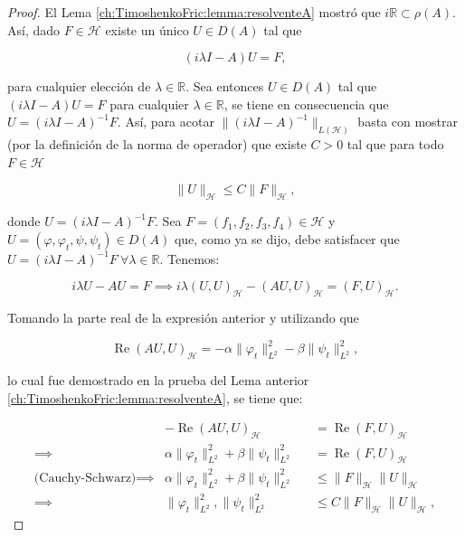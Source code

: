 \begin{proof}
    El Lema \ref{ch:TimoshenkoFric:lemma:resolventeA} mostró que $i\mathbb{R} \subset \rho(A)$. Así, dado $F \in \mathcal{H}$ existe un único $U \in D(A)$ tal que

    \[(i\lambda I - A)U = F,\]

    para cualquier elección de $\lambda \in \mathbb{R}$. Sea entonces $U \in D(A)$ tal que $(i\lambda I - A)U = F$ para cualquier $\lambda \in \mathbb{R}$, se tiene en consecuencia que $U = (i\lambda I - A)^{-1}F$. Así, para acotar $\lVert (i\lambda I - A)^{-1}\rVert_{L(\mathcal{H})}$ basta con mostrar (por la definición de la norma de operador) que existe $C > 0$ tal que para todo $F \in \mathcal{H}$

    \[\lVert U \rVert_{\mathcal{H}} \leq C \lVert F \rVert_{\mathcal{H}},\]

    donde $U = (i\lambda I - A)^{-1}F$. Sea $F = (f_1, f_2, f_3, f_4) \in \mathcal{H}$ y $U = (\varphi, \varphi_t, \psi, \psi_t) \in D(A)$ que, como ya se dijo, debe satisfacer que $U = (i\lambda I - A)^{-1}F \ \forall \lambda \in \mathbb{R}$. Tenemos:

    \[i\lambda U - AU = F \implies i\lambda (U,U)_{\mathcal{H}} - (AU, U)_{\mathcal{H}} = (F,U)_{\mathcal{H}}.\]

    Tomando la parte real de la expresión anterior y utilizando que

    \[\operatorname{Re}(AU, U)_{\mathcal{H}} = -\alpha \lVert \varphi_t\rVert^2_{L^2} - \beta\lVert \psi_t \rVert^2_{L^2},\]

    lo cual fue demostrado en la prueba del Lema anterior \ref{ch:TimoshenkoFric:lemma:resolventeA}, se tiene que:

    \begin{align*}
        &-\operatorname{Re}(AU, U)_{\mathcal{H}} &&= \operatorname{Re}(F,U)_{\mathcal{H}}\\
        \implies& \alpha \lVert \varphi_t\rVert^2_{L^2} + \beta\lVert \psi_t \rVert^2_{L^2} &&= \operatorname{Re}(F,U)_{\mathcal{H}}\\
        \text{(Cauchy-Schwarz)} \implies& \alpha \lVert \varphi_t\rVert^2_{L^2} + \beta\lVert \psi_t \rVert^2_{L^2} &&\leq \lVert F \rVert_{\mathcal{H}}\lVert U \rVert_{\mathcal{H}}\\
        \implies& \lVert \varphi_t\rVert^2_{L^2},\lVert \psi_t \rVert^2_{L^2} &&\leq C \lVert F \rVert_{\mathcal{H}}\lVert U \rVert_{\mathcal{H}},
    \end{align*}


\end{proof}

